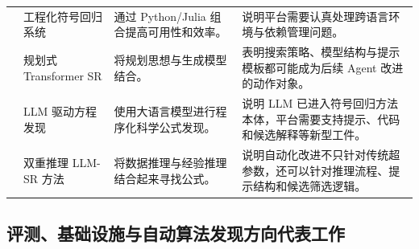 \documentclass[UTF8,12pt]{ctexart}
\begin{document}
\begin{longtable}{p{2.8cm}p{3.0cm}p{4.7cm}p{4.7cm}}
\citet{cranmer2023pysr} & 工程化符号回归系统 & 通过 Python/Julia 组合提高可用性和效率。 & 说明平台需要认真处理跨语言环境与依赖管理问题。 \\
\citet{tpsr2023} & 规划式 Transformer SR & 将规划思想与生成模型结合。 & 表明搜索策略、模型结构与提示模板都可能成为后续 Agent 改进的动作对象。 \\
\citet{shojaee2024llm} & LLM 驱动方程发现 & 使用大语言模型进行程序化科学公式发现。 & 说明 LLM 已进入符号回归方法本体，平台需要支持提示、代码和候选解释等新型工件。 \\
\citet{wang2025drsr} & 双重推理 LLM-SR 方法 & 将数据推理与经验推理结合起来寻找公式。 & 说明自动化改进不只针对传统超参数，还可以针对推理流程、提示结构和候选筛选逻辑。 \\
\end{longtable}
\normalsize

\subsection{评测、基础设施与自动算法发现方向代表工作}
\end{document}
